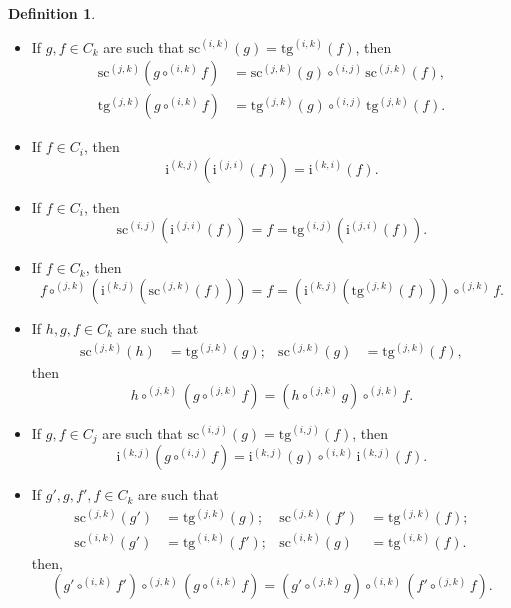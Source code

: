 \documentclass{amsart}
\theoremstyle{plain}
\theoremstyle{definition}
\newtheorem{definition}[theorem]{Definition}
\begin{document}
\begin{definition}
\begin{itemize}
\begin{align*}
\mathrm{sc}^{(j,k)}(g\circ^{(j,k)}f)&=\mathrm{sc}^{(j,k)}(f), &
\mathrm{tg}^{(j,k)}(g\circ^{(j,k)}f)&=\mathrm{tg}^{(j,k)}(g).
\end{align*}
\item[(MS3)] If $g,f\in C_{k}$ are such that $\mathrm{sc}^{(i,k)}(g)=\mathrm{tg}^{(i,k)}(f)$, then
\begin{align*}
\mathrm{sc}^{(j,k)}(g\circ^{(i,k)}f)&=\mathrm{sc}^{(j,k)}(g)\circ^{(i,j)}\mathrm{sc}^{(j,k)}(f),\\
\mathrm{tg}^{(j,k)}(g\circ^{(i,k)}f)&=\mathrm{tg}^{(j,k)}(g)\circ^{(i,j)}\mathrm{tg}^{(j,k)}(f).
\end{align*}
\item[(MS4)] If $f\in C_{i}$, then
$$
\mathrm{i}^{(k,j)}(\mathrm{i}^{(j,i)}(f))=\mathrm{i}^{(k,i)}(f).
$$
\item[(MS5)] If $f\in C_{i}$, then
$$
\mathrm{sc}^{(i,j)}(\mathrm{i}^{(j,i)}(f))=f=
\mathrm{tg}^{(i,j)}(\mathrm{i}^{(j,i)}(f)).
$$
\item[(MS6)] If $f\in C_{k}$, then
$$
f\circ^{(j,k)}
(\mathrm{i}^{(k,j)}(\mathrm{sc}^{(j,k)}(f)))
=
f
=
(\mathrm{i}^{(k,j)}(\mathrm{tg}^{(j,k)}(f)))
\circ^{(j,k)}
f.
$$
\item[(MS7)] If $h,g,f\in C_{k}$ are such that 
\begin{align*}
\mathrm{sc}^{(j,k)}(h)&=\mathrm{tg}^{(j,k)}(g); &
\mathrm{sc}^{(j,k)}(g)&=\mathrm{tg}^{(j,k)}(f),
\end{align*}
then
$$
h\circ^{(j,k)}(g\circ^{(j,k)}f)=
(h\circ^{(j,k)}g)\circ^{(j,k)}f.
$$
\item[(MS8)] If $g,f\in C_{j}$ are such that $\mathrm{sc}^{(i,j)}(g)=\mathrm{tg}^{(i,j)}(f)$, then
$$
\mathrm{i}^{(k,j)}(g\circ^{(i,j)}f)=\mathrm{i}^{(k,j)}(g)\circ^{(i,k)}\mathrm{i}^{(k,j)}(f).
$$
\item[(MS9)] If $g',g,f',f\in C_{k}$ are such that
\begin{align*}
\mathrm{sc}^{(j,k)}(g')&=\mathrm{tg}^{(j,k)}(g); &
\mathrm{sc}^{(j,k)}(f')&=\mathrm{tg}^{(j,k)}(f);\\
\mathrm{sc}^{(i,k)}(g')&=\mathrm{tg}^{(i,k)}(f'); &
\mathrm{sc}^{(i,k)}(g)&=\mathrm{tg}^{(i,k)}(f).
\end{align*}
then,
$$
(g'\circ^{(i,k)}f')\circ^{(j,k)}(g\circ^{(i,k)} f)
=
(g'\circ^{(j,k)}g)\circ^{(i,k)}(f'\circ^{(j,k)}f)
.
$$
\end{itemize}


\end{definition}
\end{document}
